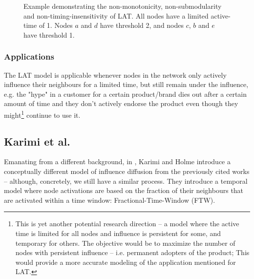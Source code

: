 \documentclass[twocolumn, 10pt]{article}
\begin{document}
\begin{figure}
\caption{Example demonstrating the non-monotonicity, non-submodularity and non-timing-insensitivity of LAT. All nodes have a limited active-time of 1. Nodes $a$ and $d$ have threshold 2, and nodes $c$, $b$ and $e$ have threshold 1.}
\label{fig:LAT1}
\end{figure}
\subsubsection{Applications}
The LAT model is applicable whenever nodes in the network only actively influence their neighbours for a limited time, but still remain under the influence, e.g. the "hype" in a customer for a certain product/brand dies out after a certain amount of time and they don't actively endorse the product even though they might\footnote{This is yet another potential research direction -- a model where the active time is limited for all nodes and influence is persistent for some, and temporary for others. The objective would be to maximize the number of nodes with persistent influence -- i.e. permanent adopters of the product; This would provide a more accurate modeling of the application mentioned for LAT.} continue to use it.
\subsection{Karimi et al. \cite{karimi}}
Emanating from a different background, in \cite{karimi}, Karimi and Holme introduce a conceptually different model of influence diffusion from the previously cited works -- although, concretely, we still have a similar process. They introduce a temporal model where node activations are based on the fraction of their neighbours that are activated within a time window: Fractional-Time-Window (FTW).
\end{document}
